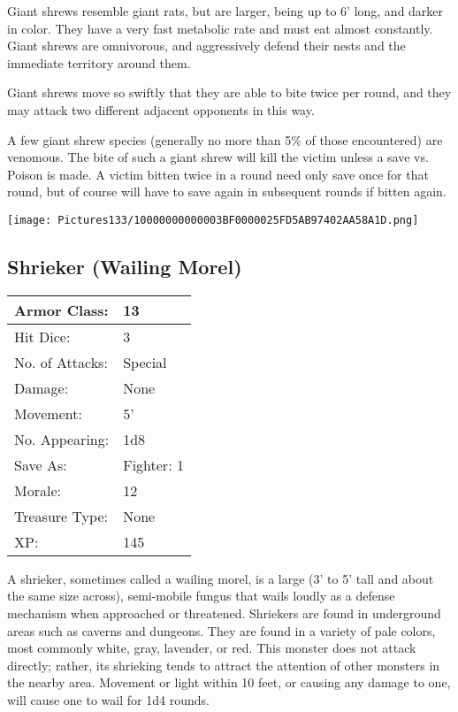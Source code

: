 \documentclass[a4paper,twoside,openany,10pt]{book}
\begin{document}
\begin{multicols}{2}
Giant shrews resemble giant rats, but are larger, being up to 6' long, and darker in color. They have a very fast metabolic rate and must eat almost constantly. Giant shrews are omnivorous, and aggressively defend their nests and the immediate territory around them.

Giant shrews move so swiftly that they are able to bite twice per round, and they may attack two different adjacent opponents in this way.

A few giant shrew species (generally no more than 5\% of those encountered) are venomous. The bite of such a giant shrew will kill the victim unless a save vs. Poison is made. A victim bitten twice in a round need only save once for that round, but of course will have to save again in subsequent rounds if bitten again.

\begin{center} \texttt{[image: Pictures133/10000000000003BF0000025FD5AB97402AA58A1D.png]} \end{center}


\subsection*{Shrieker (Wailing Morel)}\label{shrieker-wailing-morel}

\begin{tabularx}{0.50\textwidth}{@{}lX@{}}
Armor Class: & 13 \\\hline
Hit Dice: & 3 \\\hline
No. of Attacks: & Special \\\hline
Damage: & None \\\hline
Movement: & 5' \\\hline
No. Appearing: & 1d8 \\\hline
Save As: & Fighter: 1 \\\hline
Morale: & 12 \\\hline
Treasure Type: & None \\\hline
XP: & 145 \\\hline
\end{tabularx}\medskip

A shrieker, sometimes called a wailing morel,\textbf{ }is a large (3' to 5' tall and about the same size across), semi-mobile fungus that wails loudly as a defense mechanism when approached or threatened. Shriekers are found in underground areas such as caverns and dungeons. They are found in a variety of pale colors, most commonly white, gray, lavender, or red.  This monster does not attack directly; rather, its shrieking tends to attract the attention of other monsters in the nearby area. Movement or light within 10 feet, or causing any damage to one, will cause one to wail for 1d4 rounds.


\end{multicols}
\end{document}
